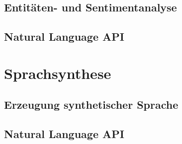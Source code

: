 \documentclass[12pt,a4paper]{article}
\begin{document}
\subsection{Entitäten- und Sentimentanalyse}
\subsection{Natural Language API}

\newpage

\section{Sprachsynthese}
\subsection{Erzeugung synthetischer Sprache}
\subsection{Natural Language API}

\newpage
\thispagestyle{empty}
\printbibliography
\end{document}
